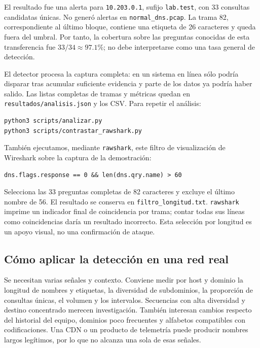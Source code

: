 \documentclass[11pt,a4paper]{article}
\begin{document}
El resultado fue una alerta para \nolinkurl{10.203.0.1}, sufijo
\nolinkurl{lab.test}, con 33 consultas candidatas únicas. No generó alertas
en \nolinkurl{normal_dns.pcap}. La trama 82, correspondiente al último bloque,
contiene una etiqueta de 26 caracteres y queda fuera del umbral. Por tanto,
la cobertura sobre las preguntas conocidas de esta transferencia fue
$33/34\approx97.1\%$; no debe interpretarse como una tasa general de detección.

El detector procesa la captura completa: en un sistema en línea sólo podría
disparar tras acumular suficiente evidencia y parte de los datos ya podría
haber salido. Las listas completas de tramas y métricas quedan en
\nolinkurl{resultados/analisis.json} y los CSV. Para repetir el análisis:
\par\noindent\begin{minipage}{\linewidth}
\begin{lstlisting}
python3 scripts/analizar.py
python3 scripts/contrastar_rawshark.py
\end{lstlisting}
\end{minipage}\par\medskip

También ejecutamos, mediante \texttt{rawshark}, este filtro de visualización
de Wireshark sobre la captura de la demostración:
\par\noindent\begin{minipage}{\linewidth}
\begin{lstlisting}
dns.flags.response == 0 && len(dns.qry.name) > 60
\end{lstlisting}
\end{minipage}\par\medskip
Selecciona las 33 preguntas completas de 82 caracteres y excluye el último
nombre de 56. El resultado se conserva en \nolinkurl{filtro_longitud.txt}.
\texttt{rawshark} imprime un indicador final de coincidencia por trama;
contar todas sus líneas como coincidencias daría un resultado incorrecto.
Esta selección por longitud es un apoyo visual, no una confirmación de ataque.

\subsection{Cómo aplicar la detección en una red real}

Se necesitan varias señales y contexto. Conviene medir por host y dominio
la longitud de nombres y etiquetas, la diversidad de subdominios, la
proporción de consultas únicas, el volumen y los intervalos. Secuencias
con alta diversidad y destino concentrado merecen investigación. También
interesan cambios respecto del historial del equipo, dominios poco frecuentes
y alfabetos compatibles con codificaciones. Una CDN o un producto de
telemetría puede producir nombres largos legítimos, por lo que no alcanza
una sola de esas señales.
\end{document}
